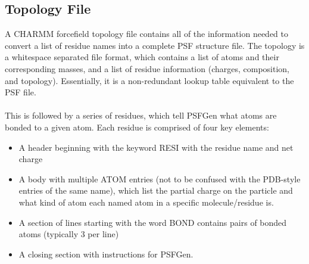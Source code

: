 \subsection{Topology File}
A CHARMM forcefield topology file contains all of the information needed to convert a list of residue names into a complete PSF structure file. The topology is a whitespace separated file format, which contains a list of atoms and their corresponding masses, and a list of residue information (charges, composition, and topology). Essentially, it is a non-redundant lookup table equivalent to the PSF file.\\\\
This is followed by a series of residues, which tell PSFGen what atoms are bonded to a given atom. Each residue is comprised of four key elements:
\begin{itemize}
\item A header beginning with the keyword RESI with the residue name and net charge
\item A body with multiple ATOM entries (not to be confused with the PDB-style entries of the same name), which list the partial charge on the particle and what kind of atom each named atom in a specific molecule/residue is.
\item A section of lines starting with the word BOND contains pairs of bonded atoms (typically 3 per line)
\item A closing section with instructions for PSFGen.
\end{itemize}

